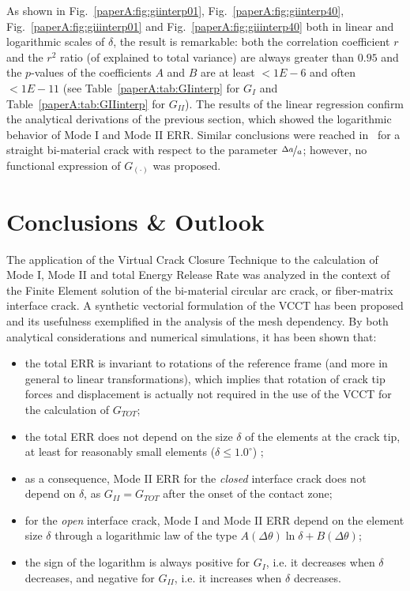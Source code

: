 As shown in Fig.~\ref{paperA:fig:giinterp01}, Fig.~\ref{paperA:fig:giinterp40}, Fig.~\ref{paperA:fig:giiinterp01} and Fig.~\ref{paperA:fig:giiinterp40} both in linear and logarithmic scales of $\delta$, the result is remarkable: both the correlation coefficient $r$ and the $r^{2}$ ratio (of explained to total variance) are always greater than $0.95$ and the $p$-values of the coefficients $A$ and $B$ are at least $<1E-6$ and often $<1E-11$ (see Table~\ref{paperA:tab:GIinterp} for $G_{I}$ and Table~\ref{paperA:tab:GIIinterp} for $G_{II}$). The results of the linear regression confirm the analytical derivations of the previous section, which showed the logarithmic behavior of Mode I and Mode II ERR. Similar conclusions were reached in~\cite{Sun1987,Manoharan1990} for a straight bi-material crack with respect to the parameter $\nicefrac{\Delta a}{a}$; however, no functional expression of $G_{\left(\cdot\right)}$ was proposed.

\section{Conclusions \& Outlook}

The application of the Virtual Crack Closure Technique to the calculation of Mode I, Mode II and total Energy Release Rate was analyzed in the context of the Finite Element solution of the bi-material circular arc crack, or fiber-matrix interface crack. A synthetic vectorial formulation of the VCCT has been proposed and its usefulness exemplified in the analysis of the mesh dependency. By both analytical considerations and numerical simulations, it has been shown that:

\begin{itemize}
\item the total ERR is invariant to rotations of the reference frame (and more in general to linear transformations), which implies that rotation of crack tip forces and displacement is actually not required in the use of the VCCT for the calculation of $G_{TOT}$;
\item the total ERR does not depend on the size $\delta$ of the elements at the crack tip, at least for reasonably small elements ($\delta\leq1.0^{\circ}$) ;
\item as a consequence, Mode II ERR for the \emph{closed} interface crack does not depend on $\delta$, as $G_{II}=G_{TOT}$ after the onset of the contact zone;
\item for the \emph{open} interface crack, Mode I and Mode II ERR depend on the element size $\delta$ through a logarithmic law of the type $A\left(\Delta\theta\right)\ln\delta+B\left(\Delta\theta\right)$;
\item the sign of the logarithm is always positive for $G_{I}$, i.e. it decreases when $\delta$ decreases, and negative for $G_{II}$, i.e. it increases when $\delta$ decreases.
\end{itemize}

